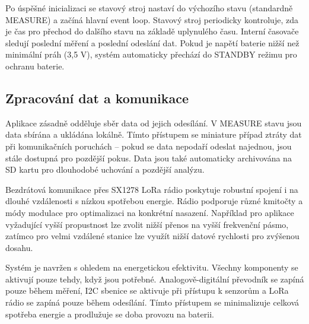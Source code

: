 \documentclass[12pt,a4paper]{article}
\begin{document}
Po úspěšné inicializaci se stavový stroj nastaví do výchozího stavu (standardně MEASURE) a začíná hlavní event loop. Stavový stroj periodicky kontroluje, zda je čas pro přechod do dalšího stavu na základě uplynulého času. Interní časovače sledují poslední měření a poslední odeslání dat. Pokud je napětí baterie nižší než minimální práh (3,5 V), systém automaticky přechází do STANDBY režimu pro ochranu baterie.

\subsection*{Zpracování dat a komunikace}

Aplikace zásadně odděluje sběr data od jejich odesílání. V MEASURE stavu jsou data sbírána a ukládána lokálně. Tímto přístupem se miniature případ ztráty dat při komunikačních poruchách -- pokud se data nepodaří odeslat najednou, jsou stále dostupná pro pozdější pokus. Data jsou také automaticky archivována na SD kartu pro dlouhodobé uchování a pozdější analýzu.

Bezdrátová komunikace přes SX1278 LoRa rádio poskytuje robustní spojení i na dlouhé vzdálenosti s nízkou spotřebou energie. Rádio podporuje různé kmitočty a módy modulace pro optimalizaci na konkrétní nasazení. Například pro aplikace vyžadující vyšší propustnost lze zvolit nižší přenos na vyšší frekvenční pásmo, zatímco pro velmi vzdálené stanice lze využít nižší datové rychlosti pro zvýšenou dosahu.

Systém je navržen s ohledem na energetickou efektivitu. Všechny komponenty se aktivují pouze tehdy, když jsou potřebné. Analogově-digitální převodník se zapíná pouze během měření, I2C sbenice se aktivuje při přístupu k senzorům a LoRa rádio se zapíná pouze během odesílání. Tímto přístupem se minimalizuje celková spotřeba energie a prodlužuje se doba provozu na baterii.
\end{document}
